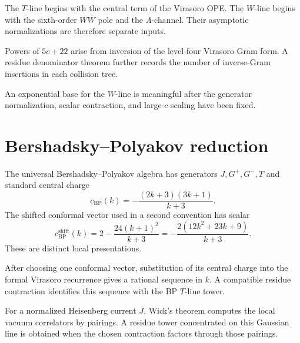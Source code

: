 \begin{remark}
\label{rem:w3-two-scales}
The \(T\)-line begins with the central term of the Virasoro OPE\@.  The
\(W\)-line begins with the sixth-order \(WW\) pole and the
\(\Lambda\)-channel.  Their asymptotic normalizations are therefore
separate inputs.
\end{remark}

\begin{remark}
\label{rem:w3-wline-denominator-pattern}
Powers of \(5c+22\) arise from inversion of the level-four Virasoro
Gram form.  A residue denominator theorem further records the number
of inverse-Gram insertions in each collision tree.
\end{remark}

\begin{remark}
\label{rem:w3-wline-ref-to-exponential-base}
An exponential base for the \(W\)-line is meaningful after the
generator normalization, scalar contraction, and large-\(c\) scaling
have been fixed.
\end{remark}

\section{Bershadsky--Polyakov reduction}
\label{sec:bp-shadow-tower}

The universal Bershadsky--Polyakov algebra has generators
\(J,G^+,G^-,T\) and standard central charge
\[
 c_{\mathrm{BP}}(k)=-\frac{(2k+3)(3k+1)}{k+3}.
\]
The shifted conformal vector used in a second convention has scalar
\[
 c_{\mathrm{BP}}^{\mathrm{shift}}(k)
 =2-\frac{24(k+1)^2}{k+3}
 =-\frac{2(12k^2+23k+9)}{k+3}.
\]
These are distinct local presentations.

\begin{proposition}
\label{prop:bp-tline-rational}
\ClaimStatusConditional
After choosing one conformal vector, substitution of its central
charge into the formal Virasoro recurrence gives a rational sequence
in \(k\).  A compatible residue contraction identifies this sequence
with the BP \(T\)-line tower.
\end{proposition}

\begin{proposition}
\label{prop:bp-jline-gaussian}
\ClaimStatusConditional
For a normalized Heisenberg current \(J\), Wick's theorem computes the
local vacuum correlators by pairings.  A residue tower concentrated on
this Gaussian line is obtained when the chosen contraction factors
through those pairings.
\end{proposition}

